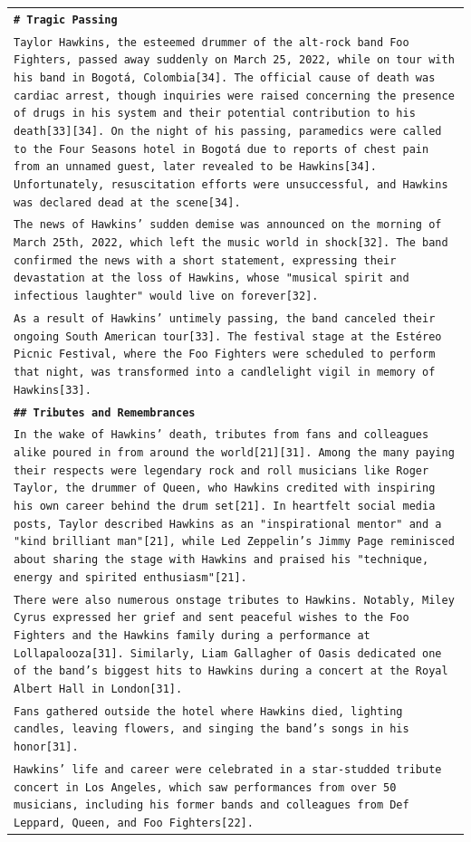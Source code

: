 \begin{longtable}{p{\textwidth}}
\vspace{1pt}
\texttt{\small{\textbf{\# Tragic Passing}}} \\
\texttt{\small{Taylor Hawkins, the esteemed drummer of the alt-rock band Foo Fighters, passed away suddenly on March 25, 2022, while on tour with his band in Bogotá, Colombia[34]. The official cause of death was cardiac arrest, though inquiries were raised concerning the presence of drugs in his system and their potential contribution to his death[33][34]. On the night of his passing, paramedics were called to the Four Seasons hotel in Bogotá due to reports of chest pain from an unnamed guest, later revealed to be Hawkins[34]. Unfortunately, resuscitation efforts were unsuccessful, and Hawkins was declared dead at the scene[34].}} \\
\texttt{\small{The news of Hawkins' sudden demise was announced on the morning of March 25th, 2022, which left the music world in shock[32]. The band confirmed the news with a short statement, expressing their devastation at the loss of Hawkins, whose "musical spirit and infectious laughter" would live on forever[32].}} \\
\texttt{\small{As a result of Hawkins' untimely passing, the band canceled their ongoing South American tour[33]. The festival stage at the Estéreo Picnic Festival, where the Foo Fighters were scheduled to perform that night, was transformed into a candlelight vigil in memory of Hawkins[33].}} \\
\vspace{1pt}
\texttt{\small{\textbf{\#\# Tributes and Remembrances}}} \\
\texttt{\small{In the wake of Hawkins' death, tributes from fans and colleagues alike poured in from around the world[21][31]. Among the many paying their respects were legendary rock and roll musicians like Roger Taylor, the drummer of Queen, who Hawkins credited with inspiring his own career behind the drum set[21]. In heartfelt social media posts, Taylor described Hawkins as an "inspirational mentor" and a "kind brilliant man"[21], while Led Zeppelin's Jimmy Page reminisced about sharing the stage with Hawkins and praised his "technique, energy and spirited enthusiasm"[21].}} \\
\texttt{\small{There were also numerous onstage tributes to Hawkins. Notably, Miley Cyrus expressed her grief and sent peaceful wishes to the Foo Fighters and the Hawkins family during a performance at Lollapalooza[31]. Similarly, Liam Gallagher of Oasis dedicated one of the band's biggest hits to Hawkins during a concert at the Royal Albert Hall in London[31].}} \\
\texttt{\small{Fans gathered outside the hotel where Hawkins died, lighting candles, leaving flowers, and singing the band's songs in his honor[31].}} \\
\texttt{\small{Hawkins' life and career were celebrated in a star-studded tribute concert in Los Angeles, which saw performances from over 50 musicians, including his former bands and colleagues from Def Leppard, Queen, and Foo Fighters[22].}} \\



\end{longtable}
